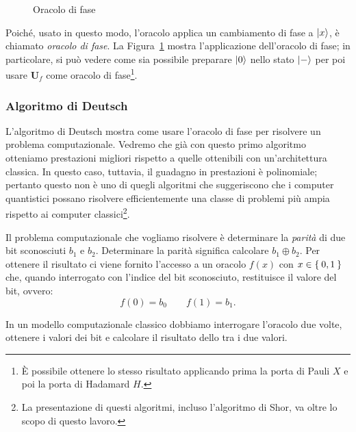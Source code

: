 \begin{figure}
	\centering
	\vspace{.2cm}
	\caption{Oracolo di fase}
	\label{fig:phase_oracle}
\end{figure}
Poiché, usato in questo modo, l'oracolo applica un cambiamento di fase a $\Ket{x}$, è chiamato \emph{oracolo di fase}. La Figura~\ref{fig:phase_oracle} mostra l'applicazione dell'oracolo di fase; in particolare, si può vedere come sia possibile preparare $\Ket{0}$ nello stato $\Ket{-}$ per poi usare $\mathbf{U}_f$ come oracolo di fase\footnote{È possibile ottenere lo stesso risultato applicando prima la porta di Pauli $X$ e poi la porta di Hadamard $H$.}.

\subsubsection*{Algoritmo di Deutsch}
L'algoritmo di Deutsch mostra come usare l'oracolo di fase per risolvere un problema computazionale. Vedremo che già con questo primo algoritmo otteniamo prestazioni migliori rispetto a quelle ottenibili con un'architettura classica. In questo caso, tuttavia, il guadagno in prestazioni è polinomiale; pertanto questo non è uno di quegli algoritmi che suggeriscono che i computer quantistici possano risolvere efficientemente una classe di problemi più ampia rispetto ai computer classici\footnote{La presentazione di questi algoritmi, incluso l'algoritmo di Shor, va oltre lo scopo di questo lavoro.}.

Il problema computazionale che vogliamo risolvere è determinare la \emph{parità} di due bit sconosciuti $b_1$ e $b_2$. Determinare la parità significa calcolare $b_1 \oplus b_2$. Per ottenere il risultato ci viene fornito l'accesso a un oracolo $f(x)$ con $x \in \Set{0,1}$ che, quando interrogato con l'indice del bit sconosciuto, restituisce il valore del bit, ovvero:
\[
f(0) = b_0 \qquad f(1) = b_1.
\]

In un modello computazionale classico dobbiamo interrogare l'oracolo due volte, ottenere i valori dei bit e calcolare il risultato dello  tra i due valori.

